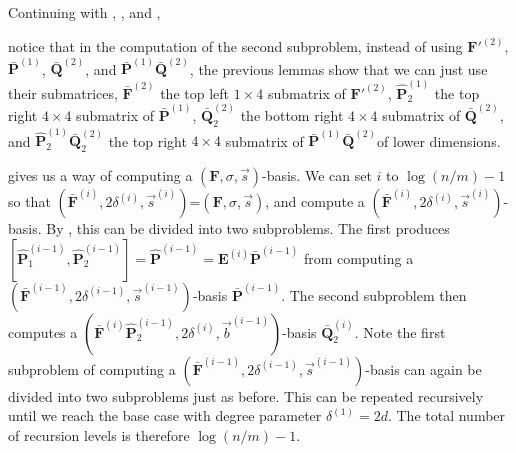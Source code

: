 \begin{exmp}
Continuing with , ,
and , %
\begin{comment}
notice that after the first subproblem, the second subproblem of computing
$\bar{\mathbf{Q}}^{(2)}$ in \prettyref{exm:subproblems} is really
a smaller problem of computing the lower right $4\times4$ submatrix
$\bar{\mathbf{Q}}_{2}^{(2)}$, which is a $(\bar{\mathbf{F}}^{\left(2\right)}\hat{\mathbf{P}}_{2}^{\left(1\right)},8,\vec{b}^{\left(1\right)})$-basis
(or equivalently a $(\mathbf{F}'^{\left(2\right)}\bar{\mathbf{P}}_{2}^{\left(1\right)},[8,4,4],\vec{b}^{\left(1\right)})$-basis),
where $\bar{\mathbf{P}}_{2}^{\left(1\right)}$ is the last $4$ columns
of $\bar{\mathbf{P}}^{(1)}$, $\vec{b}^{(1)}=[2,3,3,3]$ is the list
of column degrees of $\bar{\mathbf{P}}_{2}^{(1)}$, and $\hat{\mathbf{P}}_{2}^{\left(1\right)}$
is the first $4$ rows of $\bar{\mathbf{P}}_{2}^{(1)}$. 
\end{comment}
{}notice that in the computation of the second subproblem, instead of
using $\mathbf{F}'^{\left(2\right)},$ $\bar{\mathbf{P}}^{\left(1\right)}$,
$\bar{\mathbf{Q}}^{(2)}$, and $\bar{\mathbf{P}}^{(1)}\bar{\mathbf{Q}}^{(2)}$,
the previous lemmas show that we can just use their submatrices, $\bar{\mathbf{F}}^{(2)}$
the top left $1\times4$ submatrix of $\mathbf{F}'^{\left(2\right)}$,
$\hat{\mathbf{P}}_{2}^{(1)}$ the top right $4\times4$ submatrix
of $\bar{\mathbf{P}}^{(1)}$, $\bar{\mathbf{Q}}_{2}^{(2)}$ the bottom
right $4\times4$ submatrix of $\bar{\mathbf{Q}}^{(2)}$, and $\hat{\mathbf{P}}_{2}^{(1)}\bar{\mathbf{Q}}_{2}^{(2)}$
the top right $4\times4$ submatrix of $\bar{\mathbf{P}}^{(1)}\bar{\mathbf{Q}}^{(2)}$of
lower dimensions. 
\end{exmp}
 gives us a way of computing
a $\left(\mathbf{F},\sigma,\vec{s}\right)$-basis. We can set $i$
to $\log\left(n/m\right)-1$ so that $(\bar{\mathbf{F}}^{\left(i\right)},2\delta^{\left(i\right)},\vec{s}^{\left(i\right)})$=$\left(\mathbf{F},\sigma,\vec{s}\right)$,
and compute a $(\bar{\mathbf{F}}^{\left(i\right)},2\delta^{\left(i\right)},\vec{s}^{\left(i\right)})$-basis.
By , this can be divided into
two subproblems. The first produces $[\hat{\mathbf{P}}_{1}^{\left(i-1\right)},\hat{\mathbf{P}}_{2}^{\left(i-1\right)}]=\hat{\mathbf{P}}^{\left(i-1\right)}=\mathbf{E}^{\left(i\right)}\bar{\mathbf{P}}^{\left(i-1\right)}$
from computing a $(\bar{\mathbf{F}}^{\left(i-1\right)},2\delta^{\left(i-1\right)},\vec{s}^{\left(i-1\right)})$-basis
$\bar{\mathbf{P}}^{\left(i-1\right)}$. The second subproblem then
computes a $(\bar{\mathbf{F}}^{\left(i\right)}\hat{\mathbf{P}}_{2}^{\left(i-1\right)},2\delta^{\left(i\right)},\vec{b}^{\left(i-1\right)})$-basis
$\bar{\mathbf{Q}}_{2}^{\left(i\right)}$. Note the first subproblem
of computing a $(\bar{\mathbf{F}}^{\left(i-1\right)},2\delta^{\left(i-1\right)},\vec{s}^{\left(i-1\right)})$-basis
can again be divided into two subproblems just as before. This can
be repeated recursively until we reach the base case with degree parameter
$\delta^{\left(1\right)}=2d$. The total number of recursion levels
is therefore $\log\left(n/m\right)-1$.

